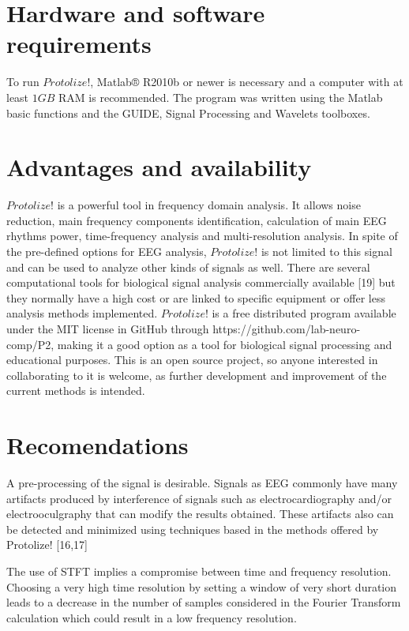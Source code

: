 \documentclass[12pt, a4paper]{article}
\begin{document}
\section{Hardware and software requirements}

To run $Protolize!$, Matlab® R2010b or newer is necessary and a computer with at least $1GB$ RAM is recommended. The program was written using the Matlab basic functions and the GUIDE, Signal Processing and Wavelets toolboxes.

\section{Advantages and availability}

$Protolize!$ is a powerful tool in frequency domain analysis. It allows noise reduction, main frequency components identification, calculation of main EEG rhythms power, time-frequency analysis and multi-resolution analysis. In spite of the pre-defined options for EEG analysis, $Protolize!$ is not limited to this signal and can be used to analyze other kinds of signals as well. There are several computational tools for biological signal analysis commercially available [19] but they normally have a high cost or are linked to specific equipment or offer less analysis methods implemented. $Protolize!$ is a free distributed program available under the MIT license in GitHub through https://github.com/lab-neuro-comp/P2, making it a good option as a tool for biological signal processing and educational purposes. This is an open source project, so anyone interested in collaborating to it is welcome, as further development and improvement of the current methods is intended.

\section{Recomendations}

A pre-processing of the signal is desirable. Signals as EEG commonly have many artifacts produced by interference of signals such as electrocardiography and/or electrooculgraphy that can modify the results obtained. These artifacts also can be detected and minimized using techniques based in the methods offered by Protolize! [16,17]

The use of STFT implies a compromise between time and frequency resolution. Choosing a very high time resolution by setting a window of very short duration leads to a decrease in the number of samples considered in the Fourier Transform calculation which could result in a low frequency resolution.
\end{document}
